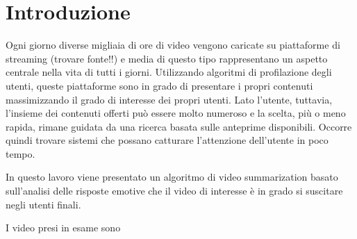 \section{Introduzione}

Ogni giorno diverse migliaia di ore di video vengono caricate su piattaforme di streaming (trovare fonte!!) e media di questo tipo rappresentano un aspetto centrale nella vita di tutti i giorni. Utilizzando algoritmi di profilazione degli utenti, queste piattaforme sono in grado di presentare i propri contenuti massimizzando il grado di interesse dei propri utenti. Lato l'utente, tuttavia, l'insieme dei contenuti offerti può essere molto numeroso e la scelta, più o meno rapida, rimane guidata da una ricerca basata sulle anteprime disponibili. Occorre quindi trovare sistemi che possano catturare l'attenzione dell'utente in poco tempo.

In questo lavoro viene presentato un algoritmo di video summarization basato sull'analisi delle risposte emotive che il video di interesse è in grado si suscitare negli utenti finali.

I video presi in esame sono
